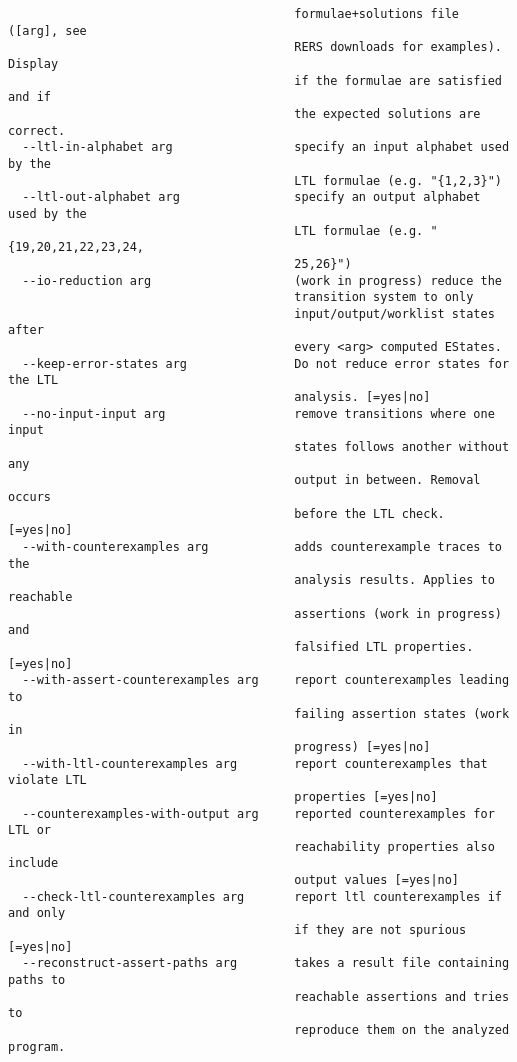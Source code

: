 \documentclass[natbib]{article}
\begin{document}
\begin{verbatim}
                                        formulae+solutions file ([arg], see 
                                        RERS downloads for examples). Display 
                                        if the formulae are satisfied and if 
                                        the expected solutions are correct.
  --ltl-in-alphabet arg                 specify an input alphabet used by the 
                                        LTL formulae (e.g. "{1,2,3}")
  --ltl-out-alphabet arg                specify an output alphabet used by the 
                                        LTL formulae (e.g. "{19,20,21,22,23,24,
                                        25,26}")
  --io-reduction arg                    (work in progress) reduce the 
                                        transition system to only 
                                        input/output/worklist states after 
                                        every <arg> computed EStates.
  --keep-error-states arg               Do not reduce error states for the LTL 
                                        analysis. [=yes|no]
  --no-input-input arg                  remove transitions where one input 
                                        states follows another without any 
                                        output in between. Removal occurs 
                                        before the LTL check. [=yes|no]
  --with-counterexamples arg            adds counterexample traces to the 
                                        analysis results. Applies to reachable 
                                        assertions (work in progress) and 
                                        falsified LTL properties. [=yes|no]
  --with-assert-counterexamples arg     report counterexamples leading to 
                                        failing assertion states (work in 
                                        progress) [=yes|no]
  --with-ltl-counterexamples arg        report counterexamples that violate LTL
                                        properties [=yes|no]
  --counterexamples-with-output arg     reported counterexamples for LTL or 
                                        reachability properties also include 
                                        output values [=yes|no]
  --check-ltl-counterexamples arg       report ltl counterexamples if and only 
                                        if they are not spurious [=yes|no]
  --reconstruct-assert-paths arg        takes a result file containing paths to
                                        reachable assertions and tries to 
                                        reproduce them on the analyzed program.

\end{verbatim}
\end{document}

